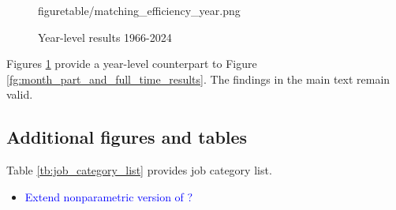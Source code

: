 \documentclass[12pt]{article}
\begin{document}
\begin{figure}[!ht]
\begin{center}
{  {figuretable/matching_efficiency_year.png}}
  \\
  \caption{Year-level results 1966-2024}
  \label{fg:year_results} 
  \end{center}
  \footnotesize
\end{figure} 

Figures \ref{fg:year_results} provide a year-level counterpart to Figure \ref{fg:month_part_and_full_time_results}. 
The findings in the main text remain valid.

\subsection{Additional figures and tables}

Table \ref{tb:job_category_list} provides job category list.

\begin{itemize}
    \item \textcolor{blue}{Extend nonparametric version of \cite{kawata2021first}?}
\end{itemize}
\end{document}
